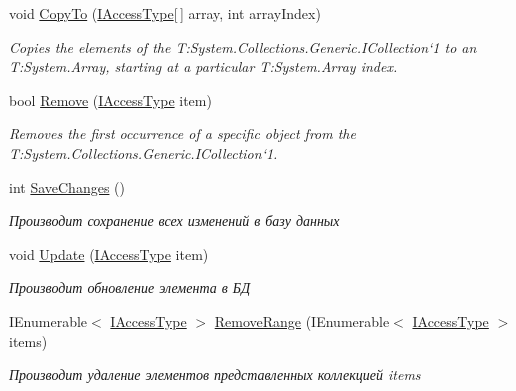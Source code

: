 \begin{DoxyCompactItemize}
void \hyperlink{class_security_1_1_entity_framework_1_1_collections_1_1_access_type_collection_a4205a769e5ecee02914f87b1fd612097}{Copy\+To} (\hyperlink{interface_security_1_1_interfaces_1_1_model_1_1_i_access_type}{I\+Access\+Type}\mbox{[}$\,$\mbox{]} array, int array\+Index)
\begin{DoxyCompactList}\small\item\em Copies the elements of the T\+:\+System.\+Collections.\+Generic.\+I\+Collection`1 to an T\+:\+System.\+Array, starting at a particular T\+:\+System.\+Array index. \end{DoxyCompactList}\item 
bool \hyperlink{class_security_1_1_entity_framework_1_1_collections_1_1_access_type_collection_a6c193d1581e2db71f87ce4d892419e60}{Remove} (\hyperlink{interface_security_1_1_interfaces_1_1_model_1_1_i_access_type}{I\+Access\+Type} item)
\begin{DoxyCompactList}\small\item\em Removes the first occurrence of a specific object from the T\+:\+System.\+Collections.\+Generic.\+I\+Collection`1. \end{DoxyCompactList}\item 
int \hyperlink{class_security_1_1_entity_framework_1_1_collections_1_1_access_type_collection_a5ebbe2f07e4552c3701330f31ab1c273}{Save\+Changes} ()
\begin{DoxyCompactList}\small\item\em Производит сохранение всех изменений в базу данных \end{DoxyCompactList}\item 
void \hyperlink{class_security_1_1_entity_framework_1_1_collections_1_1_access_type_collection_a3c3d40e8ab21482cae8f8471db9feb3e}{Update} (\hyperlink{interface_security_1_1_interfaces_1_1_model_1_1_i_access_type}{I\+Access\+Type} item)
\begin{DoxyCompactList}\small\item\em Производит обновление элемента в БД \end{DoxyCompactList}\item 
I\+Enumerable$<$ \hyperlink{interface_security_1_1_interfaces_1_1_model_1_1_i_access_type}{I\+Access\+Type} $>$ \hyperlink{class_security_1_1_entity_framework_1_1_collections_1_1_access_type_collection_a945ba748eb8960ac57a43ce6c266568b}{Remove\+Range} (I\+Enumerable$<$ \hyperlink{interface_security_1_1_interfaces_1_1_model_1_1_i_access_type}{I\+Access\+Type} $>$ items)
\begin{DoxyCompactList}\small\item\em Производит удаление элементов представленных коллекцией items \end{DoxyCompactList}\end{DoxyCompactItemize}

